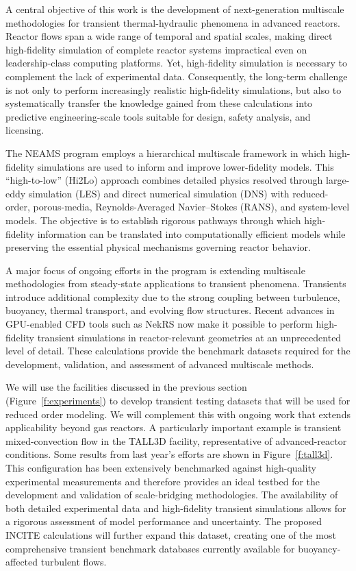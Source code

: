 A central objective of this work is the development of next-generation multiscale methodologies for transient thermal-hydraulic phenomena in advanced reactors. Reactor flows span a wide range of temporal and spatial scales, making direct high-fidelity simulation of complete reactor systems impractical even on leadership-class computing platforms. Yet, high-fidelity simulation is necessary to complement the lack of experimental data. Consequently, the long-term challenge is not only to perform increasingly realistic high-fidelity simulations, but also to systematically transfer the knowledge gained from these calculations into predictive engineering-scale tools suitable for design, safety analysis, and licensing.

The NEAMS program employs a hierarchical multiscale framework in which high-fidelity simulations are used to inform and improve lower-fidelity models. This ``high-to-low'' (Hi2Lo) approach combines detailed physics resolved through large-eddy simulation (LES) and direct numerical simulation (DNS) with reduced-order, porous-media, Reynolds-Averaged Navier--Stokes (RANS), and system-level models. The objective is to establish rigorous pathways through which high-fidelity information can be translated into computationally efficient models while preserving the essential physical mechanisms governing reactor behavior.

A major focus of ongoing efforts in the program is extending multiscale methodologies from steady-state applications to transient phenomena. Transients introduce additional complexity due to the strong coupling between turbulence, buoyancy, thermal transport, and evolving flow structures. Recent advances in GPU-enabled CFD tools such as NekRS now make it possible to perform high-fidelity transient simulations in reactor-relevant geometries at an unprecedented level of detail. These calculations provide the benchmark datasets required for the development, validation, and assessment of advanced multiscale methods.

We will use the facilities discussed in the previous section (Figure~\ref{f:experiments}) to develop transient testing datasets that will be used for reduced order modeling. We will complement this with ongoing work that extends applicability beyond gas reactors.  A particularly important example is transient mixed-convection flow in the TALL3D  \cite{nguyen2025large} facility, representative of advanced-reactor conditions. Some results from last year's efforts are shown in Figure~\ref{f:tall3d}. This configuration has been extensively benchmarked against high-quality experimental measurements \cite{nguyen2025large} and therefore provides an ideal testbed for the development and validation of scale-bridging methodologies. The availability of both detailed experimental data and high-fidelity transient simulations allows for a rigorous assessment of model performance and uncertainty. The proposed INCITE calculations will further expand this dataset, creating one of the most comprehensive transient benchmark databases currently available for buoyancy-affected turbulent flows.

